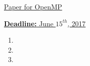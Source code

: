 \underline{Paper for OpenMP} 

\underline{\textbf{Deadline:} June $15^{th}$, 2017} 

\begin{enumerate} 
\item 
\item 
\item 
\end{enumerate}


